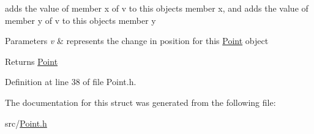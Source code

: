 adds the value of member x of v to this objects member x, and adds the value of member y of v to this objects member y 


\begin{DoxyParams}{Parameters}
{\em v} & represents the change in position for this \mbox{\hyperlink{struct_point}{Point}} object \\
\hline
\end{DoxyParams}
\begin{DoxyReturn}{Returns}
\mbox{\hyperlink{struct_point}{Point}} 
\end{DoxyReturn}


Definition at line 38 of file Point.\+h.


\begin{DoxyCode}{0}

\end{DoxyCode}


The documentation for this struct was generated from the following file\+:\begin{DoxyCompactItemize}
\item 
src/\mbox{\hyperlink{_point_8h}{Point.\+h}}\end{DoxyCompactItemize}
